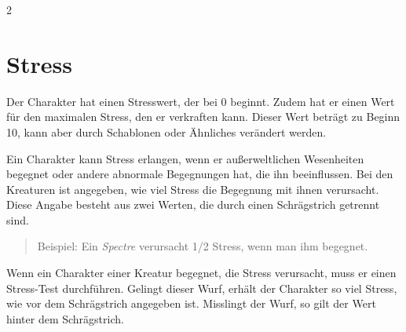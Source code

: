 \label{ch:horror}

\begin{multicols}{2}



\section{Stress}

Der Charakter hat einen Stresswert, der bei 0 beginnt. Zudem hat er einen Wert für den maximalen Stress, den er verkraften kann. Dieser Wert beträgt zu Beginn 10, kann aber durch Schablonen oder Ähnliches verändert werden.

Ein Charakter kann Stress erlangen, wenn er außerweltlichen Wesenheiten begegnet oder andere abnormale Begegnungen hat, die ihn beeinflussen. Bei den Kreaturen ist angegeben, wie viel Stress die Begegnung mit ihnen verursacht. Diese Angabe besteht aus zwei Werten, die durch einen Schrägstrich getrennt sind.

\begin{quote}
Beispiel: Ein \textit{Spectre} verursacht 1/2 Stress, wenn man ihm begegnet.
\end{quote}

Wenn ein Charakter einer Kreatur begegnet, die Stress verursacht, muss er einen Stress-Test durchführen. Gelingt dieser Wurf, erhält der Charakter so viel Stress, wie vor dem Schrägstrich angegeben ist. Misslingt der Wurf, so gilt der Wert hinter dem Schrägstrich.


\end{multicols}
